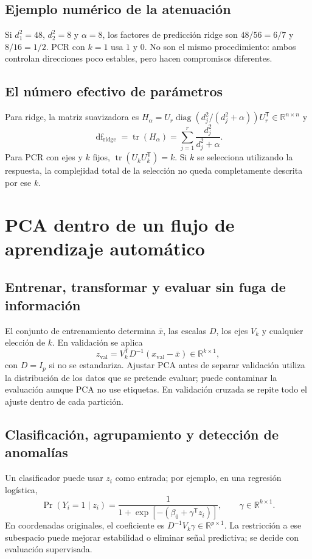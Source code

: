 \documentclass[11pt,a4paper]{article}
\newcommand{\R}{\mathbb R}
\newcommand{\T}{^{\mathsf T}}
\DeclareMathOperator{\tr}{tr}
\DeclareMathOperator{\diag}{diag}
\theoremstyle{definition}
\begin{document}
\subsection{Ejemplo numérico de la atenuación}
Si $d_1^2=48$, $d_2^2=8$ y $\alpha=8$, los factores de predicción ridge son $48/56=6/7$ y $8/16=1/2$. PCR con $k=1$ usa $1$ y $0$. No son el mismo procedimiento: ambos controlan direcciones poco estables, pero hacen compromisos diferentes.
\subsection{El número efectivo de parámetros}
Para ridge, la matriz suavizadora es $H_\alpha=U_r\diag(d_j^2/(d_j^2+\alpha))U_r\T\in\R^{n\times n}$ y
\[
\operatorname{df}_{\mathrm{ridge}}=\tr(H_\alpha)=\sum_{j=1}^r\frac{d_j^2}{d_j^2+\alpha}.
\]
Para PCR con ejes y $k$ fijos, $\tr(U_kU_k\T)=k$. Si $k$ se selecciona utilizando la respuesta, la complejidad total de la selección no queda completamente descrita por ese $k$.

\section{PCA dentro de un flujo de aprendizaje automático}
\subsection{Entrenar, transformar y evaluar sin fuga de información}
El conjunto de entrenamiento determina $\bar x$, las escalas $D$, los ejes $V_k$ y cualquier elección de $k$. En validación se aplica
\[
z_{\mathrm{val}}=V_k\T D^{-1}(x_{\mathrm{val}}-\bar x)\in\R^{k\times1},
\]
con $D=I_p$ si no se estandariza. Ajustar PCA antes de separar validación utiliza la distribución de los datos que se pretende evaluar; puede contaminar la evaluación aunque PCA no use etiquetas. En validación cruzada se repite todo el ajuste dentro de cada partición.
\subsection{Clasificación, agrupamiento y detección de anomalías}
Un clasificador puede usar $z_i$ como entrada; por ejemplo, en una regresión logística,
\[
\Pr(Y_i=1\mid z_i)=\frac1{1+\exp[-(\beta_0+\gamma\T z_i)]},\qquad
\gamma\in\R^{k\times1}.
\]
En coordenadas originales, el coeficiente es $D^{-1}V_k\gamma\in\R^{p\times1}$. La restricción a ese subespacio puede mejorar estabilidad o eliminar señal predictiva; se decide con evaluación supervisada.
\end{document}
